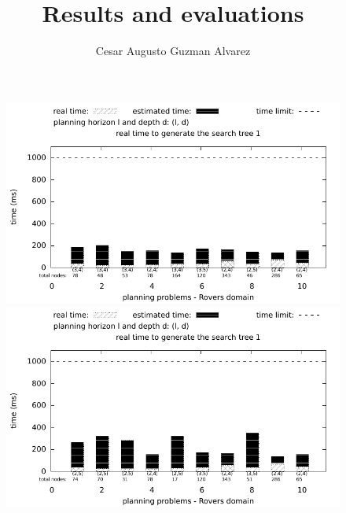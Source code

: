 \documentclass[10pt,a4paper,onecolumn]{article}
\begin{document}
\title{Results and evaluations}
\author{Cesar Augusto Guzman Alvarez}
\maketitle



\def\changemargin#1#2{\list{}{\rightmargin#2\leftmargin#1}\item[]}
\let\endchangemargin=\endlist

\begin{figure}[hbt]
	\begin{center}
		\begin{changemargin}{-5.3cm}{1cm}
			\small
			\includegraphics[totalheight=8cm]{LESS_ACTIONS_MORE_DEPTH_T1-3/15/MEDIANTIME-LESS_ACTIONS_MORE_DEPTH-T1-15.pdf} 
			\includegraphics[totalheight=8cm]{LESS_ACTIONS_MORE_DEPTH_T1-3/30/MEDIANTIME-LESS_ACTIONS_MORE_DEPTH-T1-30.pdf} 

\end{changemargin}
\end{center}
\end{figure}
\end{document}
